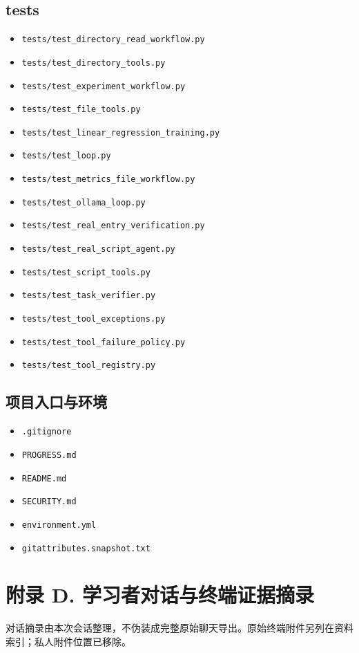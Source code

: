 \subsection{tests}
\begin{itemize}
\item \nolinkurl{tests/test_directory_read_workflow.py}
\item \nolinkurl{tests/test_directory_tools.py}
\item \nolinkurl{tests/test_experiment_workflow.py}
\item \nolinkurl{tests/test_file_tools.py}
\item \nolinkurl{tests/test_linear_regression_training.py}
\item \nolinkurl{tests/test_loop.py}
\item \nolinkurl{tests/test_metrics_file_workflow.py}
\item \nolinkurl{tests/test_ollama_loop.py}
\item \nolinkurl{tests/test_real_entry_verification.py}
\item \nolinkurl{tests/test_real_script_agent.py}
\item \nolinkurl{tests/test_script_tools.py}
\item \nolinkurl{tests/test_task_verifier.py}
\item \nolinkurl{tests/test_tool_exceptions.py}
\item \nolinkurl{tests/test_tool_failure_policy.py}
\item \nolinkurl{tests/test_tool_registry.py}
\end{itemize}

\subsection{项目入口与环境}
\begin{itemize}
\item \nolinkurl{.gitignore}
\item \nolinkurl{PROGRESS.md}
\item \nolinkurl{README.md}
\item \nolinkurl{SECURITY.md}
\item \nolinkurl{environment.yml}
\item \nolinkurl{gitattributes.snapshot.txt}
\end{itemize}

\section{附录 D. 学习者对话与终端证据摘录}
对话摘录由本次会话整理，不伪装成完整原始聊天导出。原始终端附件另列在资料索引；私人附件位置已移除。
